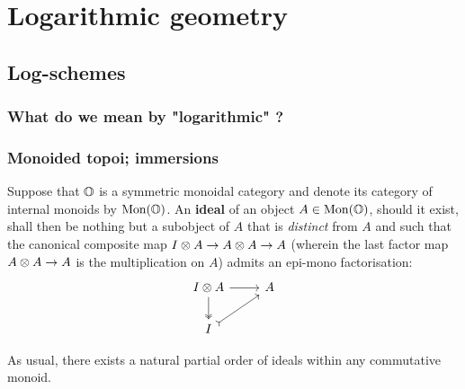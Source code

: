 \section{Logarithmic geometry}
    \subsection{Log-schemes}
        \subsubsection{What do we mean by "logarithmic" ?}
        
        \subsubsection{Monoided topoi; immersions}
            \begin{definition}[Ideals] \label{def: ideals_in_symmetric_monoidal_categories}
                Suppose that $\mathbb{O}$ is a symmetric monoidal category and denote its category of internal monoids by $\mathrm{Mon}(\mathbb{O})$. An \textbf{ideal} of an object $A \in \mathrm{Mon}(\mathbb{O})$, should it exist, shall then be nothing but a subobject of $A$ that is \textit{distinct} from $A$ and such that the canonical composite map $I \tensor A \to A \tensor A \to A$ (wherein the last factor map $A \tensor A \to A$ is the multiplication on $A$) admits an epi-mono factorisation:
                    $$
                        \begin{tikzcd}
                        	{I \tensor A} & A \\
                        	I
                        	\arrow[two heads, from=1-1, to=2-1]
                        	\arrow[tail, from=2-1, to=1-2]
                        	\arrow[from=1-1, to=1-2]
                        \end{tikzcd}
                    $$    
            \end{definition}
            \begin{remark}
                As usual, there exists a natural partial order of ideals within any commutative monoid.
            \end{remark}
            
